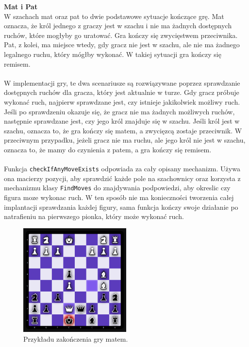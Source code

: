 \documentclass[twoside]{projektInzynierskiMS1}
\begin{document}
\noindent \textbf{Mat i Pat}\\
W szachach mat oraz pat to dwie podstawowe sytuacje kończące grę. Mat oznacza, że król jednego z graczy jest w szachu i nie ma żadnych dostępnych ruchów, które mogłyby go uratować. Gra kończy się zwycięstwem przeciwnika. Pat, z kolei, ma miejsce wtedy, gdy gracz nie jest w szachu, ale nie ma żadnego legalnego ruchu, który mógłby wykonać. W takiej sytuacji gra kończy się remisem.
\\\\
W implementacji gry, te dwa scenariusze są rozwiązywane poprzez sprawdzanie dostępnych ruchów dla gracza, który jest aktualnie w turze. Gdy gracz próbuje wykonać ruch, najpierw sprawdzane jest, czy istnieje jakikolwiek możliwy ruch. Jeśli po sprawdzeniu okazuje się, że gracz nie ma żadnych możliwych ruchów, następnie sprawdzane jest, czy jego król znajduje się w szachu. Jeśli król jest w szachu, oznacza to, że gra kończy się matem, a zwycięzcą zostaje przeciwnik. W przeciwnym przypadku, jeżeli gracz nie ma ruchu, ale jego król nie jest w szachu, oznacza to, że mamy do czynienia z patem, a gra kończy się remisem.
\\\\
Funkcja \texttt{checkIfAnyMoveExists} odpowiada za cały opisany mechanizm. Używa ona macierzy pozycji, aby sprawdzić każde pole na szachownicy oraz korzysta z mechanizmu klasy \texttt{FindMoves} do znajdywania podpowiedzi, aby okreslic czy figura moze wykonac ruch. W ten sposób nie ma konieczności tworzenia całej implantacji sprawdzania każdej figury, sama funkcja kończy swoje działanie po natrafieniu na pierwszego pionka, który może wykonać ruch.

\vspace{0.5cm}
\begin{figure}[h!]
    \centering
    \includegraphics[width=0.5\textwidth]{images/imp_front_checkmate.png}
    \caption{Przykładu zakończenia gry matem.}
\end{figure}
\end{document}
